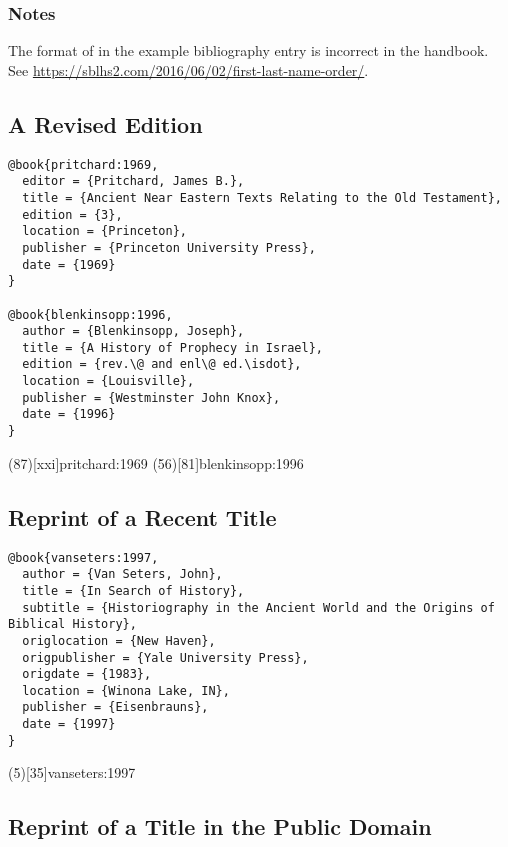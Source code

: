 \documentclass[a4paper]{article}
\begin{document}
\begin{verbcite}
  \nocite{gerhardsson:1961}
\end{verbcite}
\exampleabbreviations
\examplebibliography

\subsubsection{Notes}

The format of  in the example bibliography
entry is incorrect in the handbook. See
\url{https://sblhs2.com/2016/06/02/first-last-name-order/}.

\subsection{A Revised Edition}

\begin{verbatim}
@book{pritchard:1969,
  editor = {Pritchard, James B.},
  title = {Ancient Near Eastern Texts Relating to the Old Testament},
  edition = {3},
  location = {Princeton},
  publisher = {Princeton University Press},
  date = {1969}
}

@book{blenkinsopp:1996,
  author = {Blenkinsopp, Joseph},
  title = {A History of Prophecy in Israel},
  edition = {rev.\@ and enl\@ ed.\isdot},
  location = {Louisville},
  publisher = {Westminster John Knox},
  date = {1996}
}
\end{verbatim}

\examplecite(87)[xxi]{pritchard:1969}
\examplecite(56)[81]{blenkinsopp:1996}
\examplebibliography

\subsection{Reprint of a Recent Title}

\begin{verbatim}
@book{vanseters:1997,
  author = {Van Seters, John},
  title = {In Search of History},
  subtitle = {Historiography in the Ancient World and the Origins of Biblical History},
  origlocation = {New Haven},
  origpublisher = {Yale University Press},
  origdate = {1983},
  location = {Winona Lake, IN},
  publisher = {Eisenbrauns},
  date = {1997}
}
\end{verbatim}

\examplecite(5)[35]{vanseters:1997}
\examplebibliography

\subsection{Reprint of a Title in the Public Domain}
\end{document}
